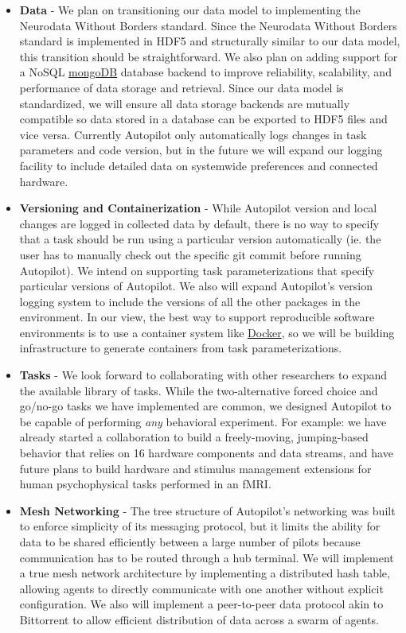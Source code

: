 \documentclass[nohyper, justified, notitlepage, marginals=raggedright,twoside=false,debug]{tufte-autopilot}
\begin{document}
\begin{fullwidth}
\begin{itemize}
    \item \textbf{Data} - We plan on transitioning our data model to implementing the Neurodata Without Borders\citep{rubelNWBAccessibleData2019} standard.  Since the Neurodata Without Borders standard is implemented in HDF5 and structurally similar to our data model, this transition should be straightforward. We also plan on adding support for a NoSQL \href{https://www.mongodb.com/}{mongoDB} database backend to improve reliability, scalability, and performance of data storage and retrieval. Since our data model is standardized, we will ensure all data storage backends are mutually compatible so data stored in a database can be exported to HDF5 files and vice versa. Currently Autopilot only automatically logs changes in task parameters and code version, but in the future we will expand our logging facility to include detailed data on systemwide preferences and connected hardware. 
    \item \textbf{Versioning and Containerization} - While Autopilot version and local changes are logged in collected data by default, there is no way to specify that a task should be run using a particular version automatically (ie. the user has to manually check out the specific git commit before running Autopilot). We intend on supporting task parameterizations that specify particular versions of Autopilot. We also will expand Autopilot's version logging system to include the versions of all the other packages in the environment. In our view, the best way to support reproducible software environments is to use a container system like \href{https://www.docker.com/}{Docker}, so we will be building infrastructure to generate containers from task parameterizations.
    \item \textbf{Tasks} - We look forward to collaborating with other researchers to expand the available library of tasks. While the two-alternative forced choice and go/no-go tasks we have implemented are common, we designed Autopilot to be capable of performing \textit{any} behavioral experiment. For example: we have already started a collaboration to build a freely-moving, jumping-based behavior that relies on 16 hardware components and data streams, and have future plans to build hardware and stimulus management extensions for human psychophysical tasks performed in an fMRI. 
    \item \textbf{Mesh Networking} - The tree structure of Autopilot's networking was built to enforce simplicity of its messaging protocol, but it limits the ability for data to be shared efficiently between a large number of pilots because communication has to be routed through a hub terminal. We will implement a true mesh network architecture by implementing a distributed hash table, allowing agents to directly communicate with one another without explicit configuration. We also will implement a peer-to-peer data protocol akin to Bittorrent to allow efficient distribution of data across a swarm of agents.

\end{itemize}
\end{fullwidth}
\end{document}
